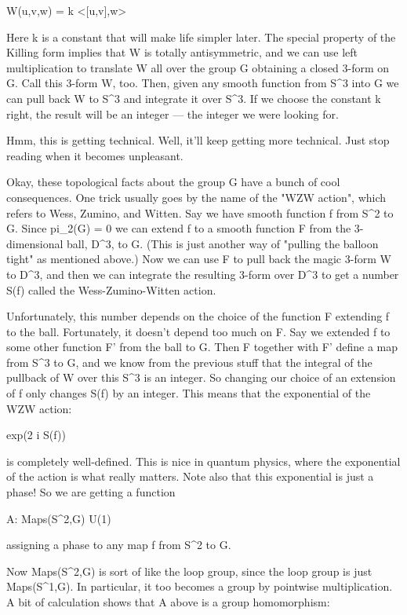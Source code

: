 W(u,v,w) = k <[u,v],w>

Here k is a constant that will make life simpler later.  The special
property of the Killing form implies that W is totally antisymmetric,
and we can use left multiplication to translate W all over the group G
obtaining a closed 3-form on G.  Call this 3-form W, too.  Then, given
any smooth function from S^3 into G we can pull back W to S^3 and
integrate it over S^3.  If we choose the constant k right, the result
will be an integer --- the integer we were looking for.

Hmm, this is getting technical.  Well, it'll keep getting more
technical.  Just stop reading when it becomes unpleasant.

Okay, these topological facts about the group G have a bunch of cool
consequences.  One trick usually goes by the name of the "WZW action",
which refers to Wess, Zumino, and Witten.  Say we have smooth function f
from S^2 to G.  Since pi_2(G) = 0 we can extend f to a smooth function F
from the 3-dimensional ball, D^3, to G.  (This is just another way of
"pulling the balloon tight" as mentioned above.)  Now we can use F to
pull back the magic 3-form W to D^3, and then we can integrate the
resulting 3-form over D^3 to get a number S(f) called the
Wess-Zumino-Witten action.  

Unfortunately, this number depends on the choice of the function F
extending f to the ball.  Fortunately, it doesn't depend too much on F.
Say we extended f to some other function F' from the ball to G.  Then F
together with F' define a map from S^3 to G, and we know from the
previous stuff that the integral of the pullback of W over this S^3 is
an integer.  So changing our choice of an extension of f only changes
S(f) by an integer.  This means that the exponential of the WZW action:

exp(2 \pi  i S(f)) 

is completely well-defined.  This is nice in quantum physics, where the
exponential of the action is what really matters.  Note also that this
exponential is just a phase!  So we are getting a function

A: Maps(S^2,G) \to  U(1)

assigning a phase to any map f from S^2 to G. 

Now Maps(S^2,G) is sort of like the loop group, since the loop group is
just Maps(S^1,G).  In particular, it too becomes a group by pointwise
multiplication.  A bit of calculation shows that A above is a group
homomorphism:

